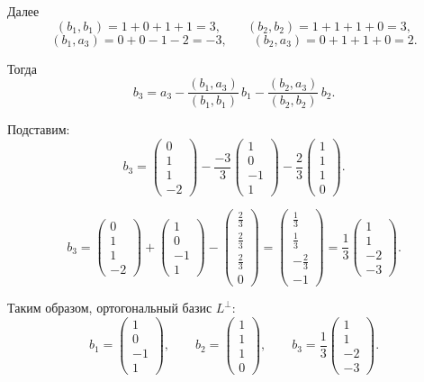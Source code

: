 Далее
\[
(b_1,b_1)=1+0+1+1=3,\qquad
(b_2,b_2)=1+1+1+0=3,
\]
\[
(b_1,a_3)=0+0-1-2=-3,\qquad
(b_2,a_3)=0+1+1+0=2.
\]

Тогда
\[
b_3=a_3-\frac{(b_1,a_3)}{(b_1,b_1)}\,b_1-\frac{(b_2,a_3)}{(b_2,b_2)}\,b_2.
\]

Подставим:
\[
b_3=
\begin{pmatrix}
0\\
1\\
1\\
-2
\end{pmatrix}
-\frac{-3}{3}
\begin{pmatrix}
1\\
0\\
-1\\
1
\end{pmatrix}
-\frac{2}{3}
\begin{pmatrix}
1\\
1\\
1\\
0
\end{pmatrix}.
\]

\[
b_3=
\begin{pmatrix}
0\\
1\\
1\\
-2
\end{pmatrix}
+
\begin{pmatrix}
1\\
0\\
-1\\
1
\end{pmatrix}
-
\begin{pmatrix}
\frac23\\
\frac23\\
\frac23\\
0
\end{pmatrix}
=
\begin{pmatrix}
\frac13\\
\frac13\\
-\frac23\\
-1
\end{pmatrix}
=
\frac13
\begin{pmatrix}
1\\
1\\
-2\\
-3
\end{pmatrix}.
\]

Таким образом, ортогональный базис $L^\perp$:
\[
b_1=
\begin{pmatrix}
1\\
0\\
-1\\
1
\end{pmatrix},
\qquad
b_2=
\begin{pmatrix}
1\\
1\\
1\\
0
\end{pmatrix},
\qquad
b_3=\frac13
\begin{pmatrix}
1\\
1\\
-2\\
-3
\end{pmatrix}.
\]

